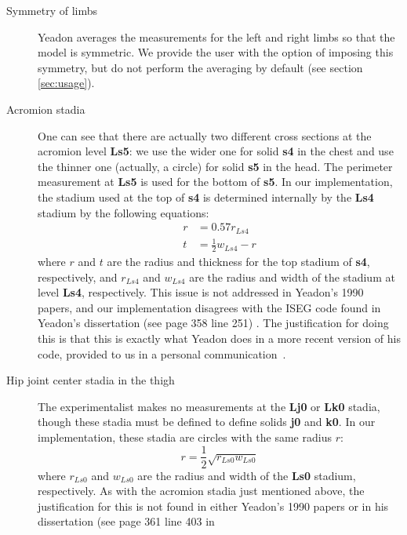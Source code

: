 \documentclass[10pt]{article}
\begin{document}
\begin{description}
    \item[Symmetry of limbs] Yeadon averages the measurements for the left and
        right limbs so that the model is symmetric. We provide the user with
        the option of imposing this symmetry, but do not perform the averaging
        by default (see section \ref{sec:usage}).
    \item[Acromion stadia] One can see that there are actually two different
        cross sections at the acromion level \textbf{Ls5}: we use the wider one
        for solid \textbf{s4} in the chest and use the thinner one (actually, a
        circle) for solid \textbf{s5} in the head. The perimeter measurement at
        \textbf{Ls5} is used for the bottom of \textbf{s5}. In our
        implementation, the stadium used at the top of \textbf{s4} is
        determined internally by the \textbf{Ls4} stadium by the following
        equations:
        \begin{align}
            r &= 0.57 r_{Ls4} \\
            t &= \frac{1}{2}w_{Ls4} - r
        \end{align}
        where $r$ and $t$ are the radius and thickness for the top stadium of
        \textbf{s4}, respectively, and $r_{Ls4}$ and $w_{Ls4}$ are the radius
        and width of the stadium at level \textbf{Ls4}, respectively.
        This issue is not addressed in Yeadon's 1990 papers, and our
        implementation disagrees with the ISEG code found in Yeadon's
        dissertation (see page 358 line 251) \cite{Yeadon1984a}. The
        justification for doing this is that this is exactly what Yeadon does
        in a more recent version of his code, provided to us in a personal
        communication~\cite{Yeadon2011}.
    \item[Hip joint center stadia in the thigh] The experimentalist makes no
        measurements at the \textbf{Lj0} or \textbf{Lk0} stadia, though these
        stadia must be defined to define solids \textbf{j0} and \textbf{k0}. In
        our implementation, these stadia are circles with the same radius $r$:
        \begin{equation}
            r = \frac{1}{2}\sqrt{r_{Ls0} w_{Ls0}}
        \end{equation}
        where $r_{Ls0}$ and $w_{Ls0}$ are the radius and width of the
        \textbf{Ls0} stadium, respectively. As with the acromion stadia just
        mentioned above, the justification for this is not found in either
        Yeadon's 1990 papers or in his dissertation (see page 361 line 403 in

\end{description}
\end{document}
